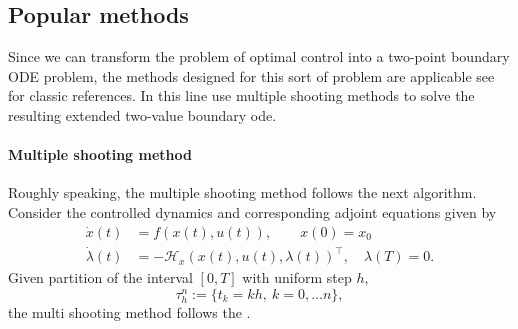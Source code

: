 \subsection{Popular methods}
Since we can transform the problem of optimal control into a two-point 
boundary ODE problem, the methods designed for this sort of problem are 
applicable see \cite{Keller1976, Ascher1987, Stoer2013} for classic references. 
In this line \cite{Caetano2001,Yan2008} use multiple shooting methods to 
solve the resulting extended two-value boundary ode.
\paragraph{Multiple shooting method}
Roughly speaking, the multiple shooting method follows the next algorithm.
Consider the controlled dynamics and corresponding adjoint equations given by
\begin{equation}
  \label{eqn:extended_tpvbp}
  \begin{aligned}
    \dot{x}(t) &= 
    f(x(t), u(t)), \qquad x(0)=x_0 \\
    \dot{\lambda}(t) &=
    -\mathcal{H}_x(x(t),u(t),\lambda(t))^\top, \quad 
    \lambda(T)=0.
  \end{aligned}
\end{equation}
Given  partition of the interval $[0, T]$ with uniform step $h$,
$$
\tau_h^n:= \{t_k = kh, \ k=0,\dots n\},
$$
the multi shooting method follows the .
